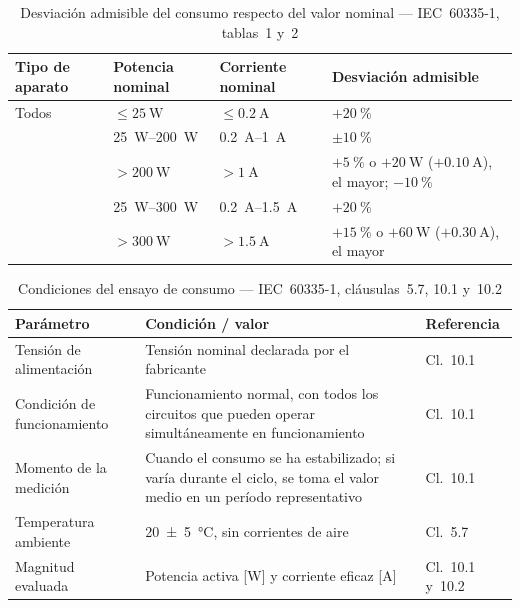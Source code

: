 \begin{table}[H]
\centering
\caption{Desviación admisible del consumo respecto del valor nominal --- IEC~60335-1, tablas~1 y~2}
\label{tab:potencia_desviacion}
\renewcommand{\arraystretch}{1.35}
\small\setlength{\tabcolsep}{4pt}
\begin{tabular}{@{} p{2.8cm} l l p{4.4cm} @{}}
\toprule
\textbf{Tipo de aparato}
    & \textbf{Potencia nominal}
    & \textbf{Corriente nominal}
    & \textbf{Desviación admisible} \\
\midrule
Todos
    & $\leq \SI{25}{\watt}$
    & $\leq \SI{0.2}{\ampere}$
    & $+\SI{20}{\percent}$ \\
\addlinespace
\multirow{2}{2.8cm}{Calefacción y combinados}
    & \SIrange[range-phrase={ a }]{25}{200}{\watt}
    & \SIrange[range-phrase={ a }]{0.2}{1}{\ampere}
    & $\pm\SI{10}{\percent}$ \\
    & $> \SI{200}{\watt}$
    & $> \SI{1}{\ampere}$
    & $+\SI{5}{\percent}$ o $+\SI{20}{\watt}$ ($+\SI{0.10}{\ampere}$),
      el mayor; $-\SI{10}{\percent}$ \\
\addlinespace
\multirow{2}{2.8cm}{A motor}
    & \SIrange[range-phrase={ a }]{25}{300}{\watt}
    & \SIrange[range-phrase={ a }]{0.2}{1.5}{\ampere}
    & $+\SI{20}{\percent}$ \\
    & $> \SI{300}{\watt}$
    & $> \SI{1.5}{\ampere}$
    & $+\SI{15}{\percent}$ o $+\SI{60}{\watt}$ ($+\SI{0.30}{\ampere}$),
      el mayor \\
\bottomrule
\end{tabular}
\end{table}

\begin{table}[H]
\centering
\caption{Condiciones del ensayo de consumo --- IEC~60335-1, cláusulas~5.7, 10.1 y~10.2}
\label{tab:potencia_condiciones}
\renewcommand{\arraystretch}{1.35}
\begin{tabular}{@{} p{4.5cm} p{6cm} p{2.5cm} @{}}
\toprule
\textbf{Parámetro} & \textbf{Condición / valor} & \textbf{Referencia} \\
\midrule
Tensión de alimentación
    & Tensión nominal declarada por el fabricante
    & Cl.~10.1 \\
\addlinespace
Condición de funcionamiento
    & Funcionamiento normal, con todos los circuitos que pueden
      operar simultáneamente en funcionamiento
    & Cl.~10.1 \\
\addlinespace
Momento de la medición
    & Cuando el consumo se ha estabilizado; si varía durante el ciclo,
      se toma el valor medio en un período representativo
    & Cl.~10.1 \\
\addlinespace
Temperatura ambiente
    & \SI{20 \pm 5}{\celsius}, sin corrientes de aire
    & Cl.~5.7 \\
\addlinespace
Magnitud evaluada
    & Potencia activa [\si{\watt}] y corriente eficaz [\si{\ampere}]
    & Cl.~10.1 y~10.2 \\
\bottomrule
\end{tabular}
\end{table}

